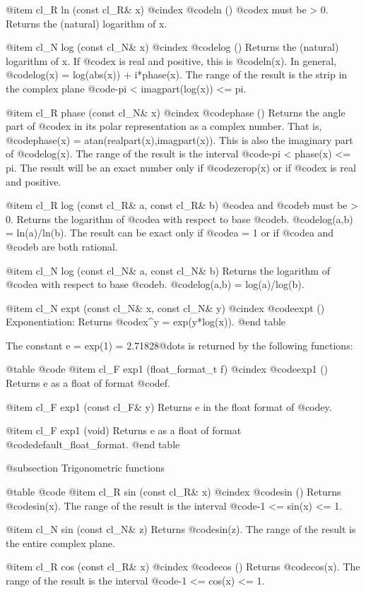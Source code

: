 @item cl_R ln (const cl_R& x)
@cindex @code{ln ()}
@code{x} must be > 0. Returns the (natural) logarithm of x.

@item cl_N log (const cl_N& x)
@cindex @code{log ()}
Returns the (natural) logarithm of x. If @code{x} is real and positive,
this is @code{ln(x)}. In general, @code{log(x) = log(abs(x)) + i*phase(x)}.
The range of the result is the strip in the complex plane
@code{-pi < imagpart(log(x)) <= pi}.

@item cl_R phase (const cl_N& x)
@cindex @code{phase ()}
Returns the angle part of @code{x} in its polar representation as a
complex number. That is, @code{phase(x) = atan(realpart(x),imagpart(x))}.
This is also the imaginary part of @code{log(x)}.
The range of the result is the interval @code{-pi < phase(x) <= pi}.
The result will be an exact number only if @code{zerop(x)} or
if @code{x} is real and positive.

@item cl_R log (const cl_R& a, const cl_R& b)
@code{a} and @code{b} must be > 0. Returns the logarithm of @code{a} with
respect to base @code{b}. @code{log(a,b) = ln(a)/ln(b)}.
The result can be exact only if @code{a = 1} or if @code{a} and @code{b}
are both rational.

@item cl_N log (const cl_N& a, const cl_N& b)
Returns the logarithm of @code{a} with respect to base @code{b}.
@code{log(a,b) = log(a)/log(b)}.

@item cl_N expt (const cl_N& x, const cl_N& y)
@cindex @code{expt ()}
Exponentiation: Returns @code{x^y = exp(y*log(x))}.
@end table

The constant e = exp(1) = 2.71828@dots{} is returned by the following functions:

@table @code
@item cl_F exp1 (float_format_t f)
@cindex @code{exp1 ()}
Returns e as a float of format @code{f}.

@item cl_F exp1 (const cl_F& y)
Returns e in the float format of @code{y}.

@item cl_F exp1 (void)
Returns e as a float of format @code{default_float_format}.
@end table


@subsection Trigonometric functions

@table @code
@item cl_R sin (const cl_R& x)
@cindex @code{sin ()}
Returns @code{sin(x)}. The range of the result is the interval
@code{-1 <= sin(x) <= 1}.

@item cl_N sin (const cl_N& z)
Returns @code{sin(z)}. The range of the result is the entire complex plane.

@item cl_R cos (const cl_R& x)
@cindex @code{cos ()}
Returns @code{cos(x)}. The range of the result is the interval
@code{-1 <= cos(x) <= 1}.

